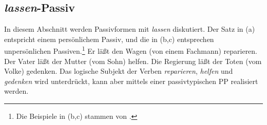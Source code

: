 \subsection{\emph{lassen}-Passiv}

In diesem Abschnitt werden Passivformen mit \emph{lassen} diskutiert.
Der Satz in (a) entspricht einem persönlichem Passiv, und
die in (b,c) entsprechen unpersönlichen Passiven.\footnote{
        Die Beispiele in (b,c) stammen von \citet[]{Reis76c}.
}
\eal
\label{bsp-lassen-passiv}
\ex{}
Er       läßt den Wagen     (von einem Fachmann) reparieren.
\ex{}
Der Vater        läßt der Mutter       (vom Sohn) helfen.
\ex{}
Die Regierung        läßt der Toten      (vom Volke) gedenken.
\zl
Das logische Subjekt der Verben \emph{reparieren}, \emph{helfen} und 
\emph{gedenken} wird unterdrückt, kann aber mittels einer passivtypischen
PP realisiert werden.

